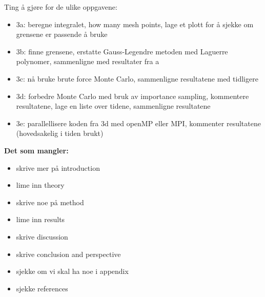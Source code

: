 \documentclass{article}
\begin{document}
Ting å gjøre for de ulike oppgavene:
\begin{itemize}

  \item 3a: beregne integralet, how many mesh points, lage et plott for å sjekke om grensene er passende å bruke \\

  \item 3b: finne grensene, erstatte Gauss-Legendre metoden med Laguerre polynomer, sammenligne med resultater fra a \\

  \item 3c: nå bruke brute force Monte Carlo, sammenligne resultatene med tidligere \\

  \item 3d: forbedre Monte Carlo med bruk av importance sampling, kommentere resultatene, lage en liste over tidene, sammenligne resultatene \\

  \item 3e: parallellisere koden fra 3d med openMP eller MPI, kommenter resultatene (hovedsakelig i tiden brukt)

\end{itemize}

\vspace{1cm}

\textbf{Det som mangler:}

\begin{itemize}
    \item skrive mer på introduction \\
    \item lime inn theory \\
    \item skrive noe på method \\
    \item lime inn results \\
    \item skrive discussion \\
    \item skrive conclusion and perspective \\
    \item sjekke om vi skal ha noe i appendix \\
    \item sjekke references \\
\end{itemize}
\end{document}
